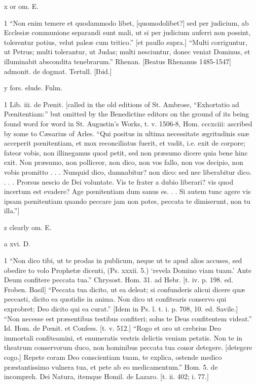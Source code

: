 x
or om. E.

1
“Non enim temere et quodammodo libet, [quomodolibet?] sed per judicium, ab Ecclesiæ communione separandi sunt mali, ut si per judicium auferri non possint, tolerentur potius, velut paleæ cum tritico.” [et paullo supra.] “Multi corriguntur, ut Petrus; multi tolerantur, ut Judas; multi nesciuntur, donec veniat Dominus, et illuminabit abscondita tenebrarum.” Rhenan. [Beatus Rhenanus 1485-1547] admonit. de dogmat. Tertull. [Ibid.]

y
fors. elude. Fulm.

1
Lib. iii. de Pœnit. [called in the old editions of St. Ambrose, “Exhortatio ad Pœnitentiam:” but omitted by the Benedictine editors on the ground of its being found word for word in St. Augustin’s Works, t. v. 1506-8, Hom. cccxciii: ascribed by some to Cæsarius of Arles. “Qui positus in ultima necessitate ægritudinis suæ acceperit pœnitentiam, et mox reconciliatus fuerit, et vadit, i.e. exit de corpore; fateor vobis, non illinegamus quod petit, sed non præsumo dicere quia bene hinc exit. Non præsumo, non polliceor, non dico, non vos fallo, non vos decipio, non vobis promitto . . . Nunquid dico, damnabitur? non dico: sed nec liberabitur dico. . . . Prorsus nescio de Dei voluntate. Vis te frater a dubio liberari? vis quod incertum est evadere? Age pœnitentiam dum sanus es. . . Si autem tunc agere vis ipsam pœnitentiam quando peccare jam non potes, peccata te dimiserunt, non tu illa.”]

z
clearly om. E.

a
xvi. D.

1
“Non dico tibi, ut te prodas in publicum, neque ut te apud alios accuses, sed obedire to volo Prophetæ dicenti, (Ps. xxxii. 5.) ‘revela Domino viam tuam.’ Ante Deum confitere peccata tua.” Chrysost. Hom. 31. ad Hebr. [t. iv. p. 198. ed. Froben. Basil] “Peccata tua dicito, ut ea deleat; si confunderis alicui dicere quæ peccasti, dicito ea quotidie in anima. Non dico ut confitearis conservo qui exprobret; Deo dicito qui ea curat.” [Idem in Ps. l. t. i. p. 708, 10. ed. Savile.] “Non necesse est præsentibus testibus confiteri; solus te Deus confitentem videat.” Id. Hom. de Pœnit. et Confess. [t. v. 512.] “Rogo et oro ut crebrius Deo immortali confiteamini, et enumeratis vestris delictis veniam petatis. Non te in theatrum conservorum duco, non hominibus peccata tua conor detegere. [detegere cogo.] Repete coram Deo conscientiam tuam, te explica, ostende medico præstantissimo vulnera tua, et pete ab eo medicamentum.” Hom. 5. de incompreh. Dei Natura, itemque Homil. de Lazaro. [t. ii. 402; i. 77.]

